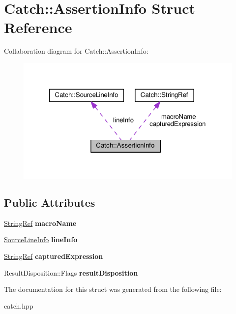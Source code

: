 \hypertarget{structCatch_1_1AssertionInfo}{}\section{Catch\+:\+:Assertion\+Info Struct Reference}
\label{structCatch_1_1AssertionInfo}


Collaboration diagram for Catch\+:\+:Assertion\+Info\+:\nopagebreak
\begin{figure}[H]
\begin{center}
\leavevmode
\includegraphics[width=321pt]{structCatch_1_1AssertionInfo__coll__graph}
\end{center}
\end{figure}
\subsection*{Public Attributes}
\begin{DoxyCompactItemize}
\item 
\hyperlink{classCatch_1_1StringRef}{String\+Ref} {\bfseries macro\+Name}\hypertarget{structCatch_1_1AssertionInfo_aaf3fbb9f1fe09c879ba3d877584e3056}{}\label{structCatch_1_1AssertionInfo_aaf3fbb9f1fe09c879ba3d877584e3056}

\item 
\hyperlink{structCatch_1_1SourceLineInfo}{Source\+Line\+Info} {\bfseries line\+Info}\hypertarget{structCatch_1_1AssertionInfo_a17bdbb404ba12658034f833be2f4c3e7}{}\label{structCatch_1_1AssertionInfo_a17bdbb404ba12658034f833be2f4c3e7}

\item 
\hyperlink{classCatch_1_1StringRef}{String\+Ref} {\bfseries captured\+Expression}\hypertarget{structCatch_1_1AssertionInfo_accd36744b4acaa3a691a72df0b42190f}{}\label{structCatch_1_1AssertionInfo_accd36744b4acaa3a691a72df0b42190f}

\item 
Result\+Disposition\+::\+Flags {\bfseries result\+Disposition}\hypertarget{structCatch_1_1AssertionInfo_a60353b3632ab2f827162f2b2d6911073}{}\label{structCatch_1_1AssertionInfo_a60353b3632ab2f827162f2b2d6911073}

\end{DoxyCompactItemize}


The documentation for this struct was generated from the following file\+:\begin{DoxyCompactItemize}
\item 
catch.\+hpp\end{DoxyCompactItemize}
